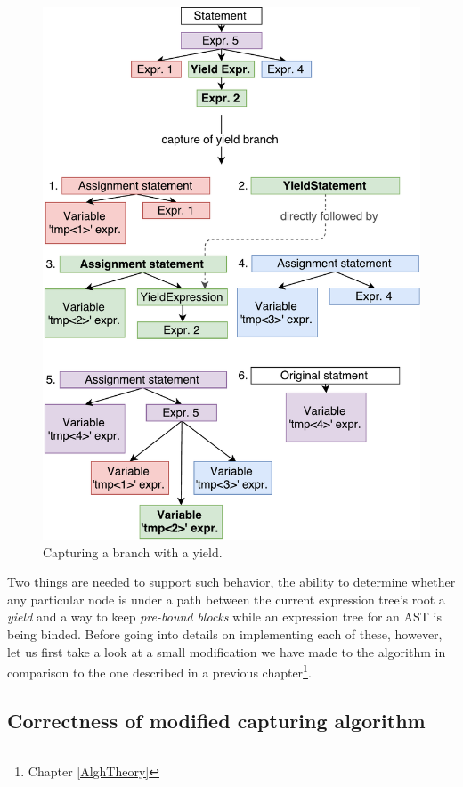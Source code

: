 \begin{figure}[H]
	\centering	
	\includegraphics[scale=0.75]{../img/5_3_branchesWithYields}	
	\caption{Capturing a branch with a yield.}
	\label{fig5.3:CaptureWithYield}
\end{figure}

Two things are needed to support such behavior, the ability to determine whether any particular node is under a path between the current expression tree’s root a \emph{yield} and a way to keep \emph{pre-bound blocks} while an expression tree for an AST is being binded. Before going into details on implementing each of these, however, let us first take a look at a small modification we have made to the algorithm in comparison to the one described in a previous chapter\footnote{Chapter \ref{AlghTheory}}.

\subsection{Correctness of modified capturing algorithm}

